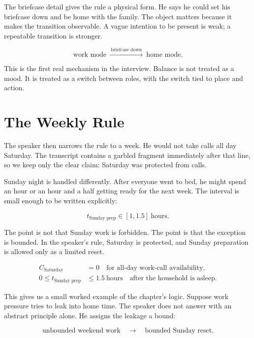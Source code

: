 The briefcase detail gives the rule a physical form. He says he could set his briefcase down and be home with the family. The object matters because it makes the transition observable. A vague intention to be present is weak; a repeatable transition is stronger.

\begin{equation}
\text{work mode}
\ \xrightarrow{\ \text{briefcase down}\ }\
\text{home mode}.
\end{equation}

This is the first real mechanism in the interview. Balance is not treated as a mood. It is treated as a switch between roles, with the switch tied to place and action.

\section{The Weekly Rule}

The speaker then narrows the rule to a week. He would not take calls all day Saturday. The transcript contains a garbled fragment immediately after that line, so we keep only the clear claim: Saturday was protected from calls.

Sunday night is handled differently. After everyone went to bed, he might spend an hour or an hour and a half getting ready for the next week. The interval is small enough to be written explicitly:

\begin{equation}
t_{\text{Sunday prep}}
\in
[1,1.5]\ \text{hours}.
\end{equation}

The point is not that Sunday work is forbidden. The point is that the exception is bounded. In the speaker's rule, Saturday is protected, and Sunday preparation is allowed only as a limited reset.

\begin{align}
C_{\text{Saturday}} &= 0
\quad \text{for all-day work-call availability},\\
0 \leq t_{\text{Sunday prep}} &\leq 1.5\ \text{hours}
\quad \text{after the household is asleep}.
\end{align}

This gives us a small worked example of the chapter's logic. Suppose work pressure tries to leak into home time. The speaker does not answer with an abstract principle alone. He assigns the leakage a bound:

\begin{equation}
\text{unbounded weekend work}
\quad \longrightarrow \quad
\text{bounded Sunday reset}.
\end{equation}

